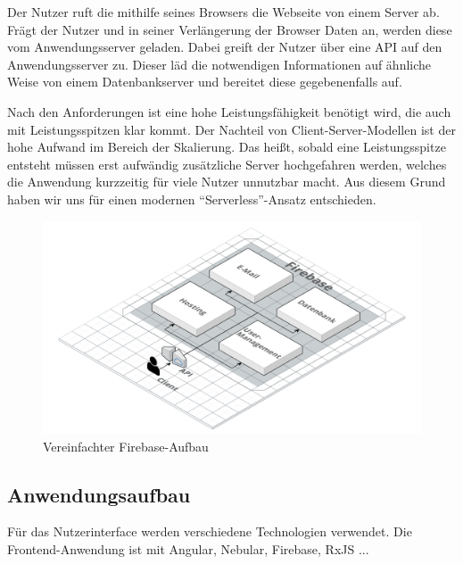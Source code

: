 Der Nutzer ruft die mithilfe seines Browsers die Webseite von einem Server ab.
Frägt der Nutzer und in seiner Verlängerung der Browser Daten an, werden diese vom Anwendungsserver geladen.
Dabei greift der Nutzer über eine \ac{API} auf den Anwendungsserver zu.
Dieser läd die notwendigen Informationen auf ähnliche Weise von einem Datenbankserver und bereitet diese gegebenenfalls auf.

Nach den Anforderungen ist eine hohe Leistungsfähigkeit benötigt wird, die auch mit Leistungsspitzen klar kommt.
Der Nachteil von Client-Server-Modellen ist der hohe Aufwand im Bereich der Skalierung.
Das heißt, sobald eine Leistungsspitze entsteht müssen erst aufwändig zusätzliche Server hochgefahren werden, welches die Anwendung kurzzeitig für viele Nutzer unnutzbar macht.
Aus diesem Grund haben wir uns für einen modernen \enquote{Serverless}-Ansatz entschieden.





\begin{figure}[h]
    \centering
    \includegraphics[width=.9\textwidth]{img/Firebase.png}
    \caption{Vereinfachter Firebase-Aufbau}
    \label{fig:firebaseAufbau}
\end{figure}



\subsection{Anwendungsaufbau}
Für das Nutzerinterface werden verschiedene Technologien verwendet.
Die Frontend-Anwendung ist mit Angular, Nebular, Firebase, RxJS ... %




